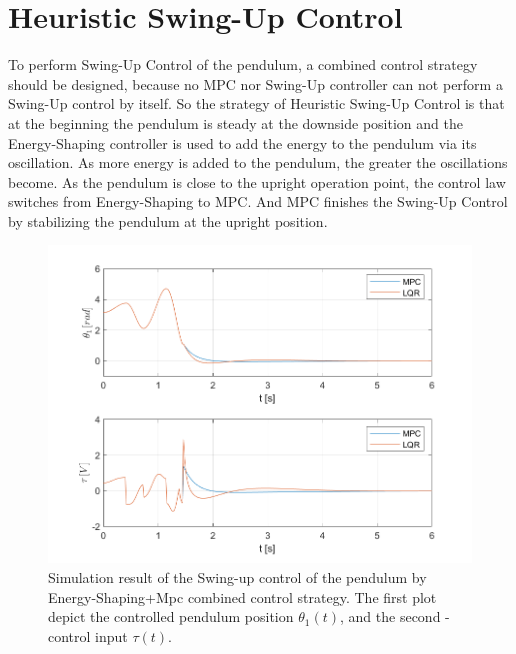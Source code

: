 \section{Heuristic Swing-Up Control}
To perform Swing-Up Control of the pendulum, a combined control strategy should be designed, because no MPC nor Swing-Up controller can not perform a Swing-Up control by itself. So the strategy of Heuristic Swing-Up Control is that at the beginning the pendulum is steady at the downside position and the Energy-Shaping controller is used to add the energy to the pendulum via its oscillation. As more energy is added to the pendulum, the greater the oscillations become. As the pendulum is close to the upright operation point, the control law switches from Energy-Shaping to MPC. And MPC finishes the Swing-Up Control by stabilizing the pendulum at the upright position.
\newpage
\begin{figure}[H]
	\centering
	\includegraphics[width=1.1\linewidth]{images/MPC-LQR_Swing}
	\caption{Simulation result of the Swing-up control of the pendulum by Energy-Shaping+Mpc combined control strategy. The first plot depict the controlled pendulum position $\theta_1(t)$, and the second - control input $\tau(t)$.}
	\label{combo}
\end{figure}
\newpage
